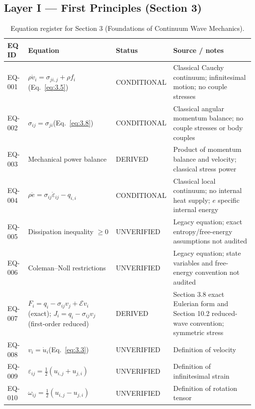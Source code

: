 \subsection{Layer I — First Principles (Section 3)}

\begin{table}[htbp]
\centering
\small
\setlength{\tabcolsep}{3pt}
\caption{Equation register for Section 3 (Foundations of Continuum Wave Mechanics).}
\label{tab:appA-sec3}
\begin{tabularx}{\textwidth}{@{}p{1.6cm}Y p{2.8cm}Y@{}}
\toprule
\textbf{EQ ID} & \textbf{Equation} & \textbf{Status} & \textbf{Source / notes} \\
\midrule
EQ-001 & $\rho \dot{v}_i = \sigma_{ji,j} + \rho f_i$\;(Eq.~\eqref{eq:3.5}) & CONDITIONAL & Classical Cauchy continuum; infinitesimal motion; no couple stresses \\
EQ-002 & $\sigma_{ij} = \sigma_{ji}$\;(Eq.~\eqref{eq:3.8}) & CONDITIONAL & Classical angular momentum balance; no couple stresses or body couples \\
EQ-003 & Mechanical power balance & DERIVED & Product of momentum balance and velocity; classical stress power \\
EQ-004 & $\rho \dot{e} = \sigma_{ij}\dot{\varepsilon}_{ij} - q_{i,i}$ & CONDITIONAL & Classical local continuum; no internal heat supply; $e$ specific internal energy \\
EQ-005 & Dissipation inequality $\geq 0$ & UNVERIFIED & Legacy equation; exact entropy/free-energy assumptions not audited \\
EQ-006 & Coleman--Noll restrictions & UNVERIFIED & Legacy equation; state variables and free-energy convention not audited \\
EQ-007 & $F_i=q_i-\sigma_{ij}v_j+\mathcal{E}v_i$ (exact); $J_i=q_i-\sigma_{ij}v_j$ (first-order reduced) & DERIVED & Section 3.8 exact Eulerian form and Section 10.2 reduced-wave convention; symmetric stress \\
EQ-008 & $v_i = \dot{u}_i$\;(Eq.~\eqref{eq:3.3}) & UNVERIFIED & Definition of velocity \\
EQ-009 & $\varepsilon_{ij} = \tfrac{1}{2}(u_{i,j} + u_{j,i})$ & UNVERIFIED & Definition of infinitesimal strain \\
EQ-010 & $\omega_{ij} = \tfrac{1}{2}(u_{i,j} - u_{j,i})$ & UNVERIFIED & Definition of rotation tensor \\
\bottomrule
\end{tabularx}
\end{table}

